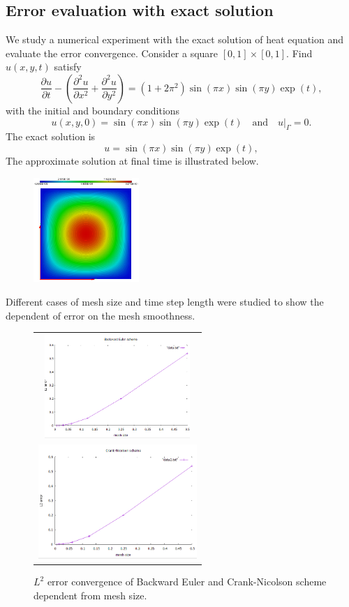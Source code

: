 \subsection{Error evaluation with exact solution}
We study a numerical experiment with the exact solution of heat equation and evaluate the error convergence. Consider a square $[0,1]\times[0,1]$. Find $u(x,y,t)$ satisfy
\begin{equation}
\dfrac{\partial u}{\partial t} - \left(\dfrac{\partial^2 u}{\partial x^2} + \dfrac{\partial^2u}{\partial y^2}\right) = (1+2\pi^2)\sin(\pi x) \sin(\pi y)\exp(t),
\end{equation}
with the initial and boundary conditions
$$
u(x,y,0) = \sin(\pi x)\sin(\pi y)\exp(t) \quad \text{and} \quad u|_\Gamma = 0.
$$
The exact solution is
$$
u = \sin(\pi x) \sin(\pi y) \exp(t),
$$
The approximate solution at final time is illustrated below.
\begin{figure}[ht]
	\centering
	\includegraphics[width=4cm]{figures/direct}
\end{figure}
Different cases of mesh size and time step length were studied to show the dependent of error on the mesh smoothness.
\begin{figure}[http]
	\centering
	\begin{tabular}{c}
		\includegraphics[width=5.5cm]{figures/BE} \\ \includegraphics[width=6cm]{figures/CN}
	\end{tabular}
	\caption{$L^2$ error convergence of Backward Euler and Crank-Nicolson scheme dependent from mesh size.}
\end{figure}
